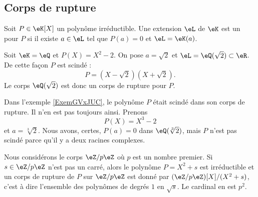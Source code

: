 \subsection{Corps de rupture}

\begin{definition}
    Soit \( P\in\eK[X]\) un polynôme irréductible. Une extension \( \eL\) de \( \eK\) est un  pour \( P\) si il existe \( a\in \eL\) tel que \( P(a)=0\) et \( \eL=\eK(a)\).
\end{definition}

\begin{example}     \label{ExemGVxJUC}
    Soit \( \eK=\eQ\) et \( P(X)=X^2-2\). On pose \( a=\sqrt{2}\) et \( \eL=\eQ(\sqrt{2})\subset\eR\). De cette façon \( P\) est scindé :
    \begin{equation}
        P=(X-\sqrt{2})(X+\sqrt{2}).
    \end{equation}
    Le corps \( \eQ(\sqrt{2})\) est donc un corps de rupture pour \( P\).
\end{example}

\begin{example}
    Dans l'exemple \ref{ExemGVxJUC}, le polynôme \( P\) était scindé dans son corps de rupture. Il n'en est pas toujours ainsi. Prenons 
    \begin{equation}
        P(X)=X^3-2
    \end{equation}
    et \( a=\sqrt[3]{2}\). Nous avons, certes, \( P(a)=0\) dans \( \eQ(\sqrt[3]{2})\), mais \( P\) n'est pas scindé parce qu'il y a deux racines complexes.
\end{example}

\begin{example}
    Nous considérons le corps \( \eZ/p\eZ\) où \( p\) est un nombre premier. Si \( s\in \eZ/p\eZ\) n'est pas un carré, alors le polynôme \(P= X^2+s\) est irréductible et un corps de rupture de \( P\) sur \( \eZ/p\eZ\) est donné par \( (\eZ/p\eZ)[X]/(X^2+s)\), c'est à dire l'ensemble des polynômes de degrés \( 1\) en \( \sqrt{s}\). Le cardinal en est \( p^2\).
\end{example}

